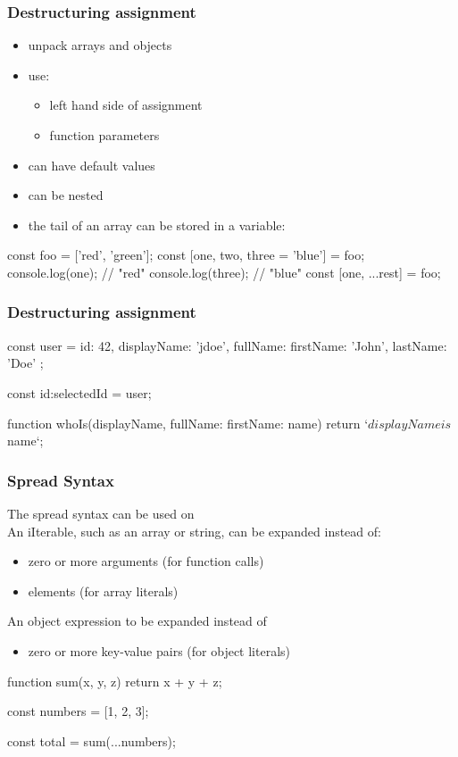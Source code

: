 \begin{frame}[fragile] \frametitle{Destructuring assignment}
\begin{itemize}
  \item unpack arrays and objects
  \item use:
  \begin{itemize}
    \item left hand side of assignment
    \item function parameters
  \end{itemize}
  \item can have default values
  \item can be nested
  \item the tail of an array can be stored in a variable: 
\end{itemize}
\begin{CodeBox}{}
const foo = ['red', 'green'];
const [one, two, three = 'blue'] = foo;
console.log(one); // "red"
console.log(three); // "blue"
const [one, ...rest] = foo;
\end{CodeBox}
\end{frame}

\begin{frame}[fragile] \frametitle{Destructuring assignment}
\begin{CodeBox}{}
const user = {
  id: 42,
  displayName: 'jdoe',
  fullName: {
    firstName: 'John',
    lastName: 'Doe'
  }
};

const {id:selectedId} = user;

function whoIs({displayName, fullName: {firstName: name}}) {
  return `${displayName} is ${name}`;
}
\end{CodeBox}
\end{frame}

\begin{frame}[fragile] \frametitle{Spread Syntax}
The spread syntax  can be used on \\
An iIterable, such as an array or string, can be expanded instead of:
\begin{itemize}
  \item zero or more arguments (for function calls)
  \item elements (for array literals)
\end{itemize}

An object expression to be expanded instead of
\begin{itemize}
  \item  zero or more key-value pairs (for object literals)
\end{itemize}

\begin{CodeBox}{}
function sum(x, y, z) {
  return x + y + z;
}

const numbers = [1, 2, 3];

const total = sum(...numbers);
\end{CodeBox}
\end{frame}

